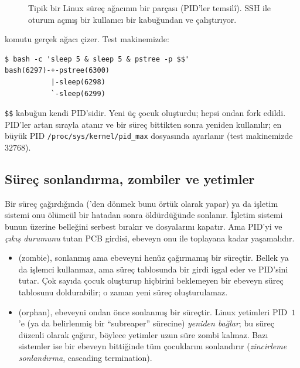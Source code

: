 \begin{figure}[H]
\centering
{}
\caption{Tipik bir Linux süreç ağacının bir parçası (PID'ler temsilî). SSH ile oturum açmış bir kullanıcı bir  kabuğundan  ve  çalıştırıyor.}
\end{figure}

 komutu gerçek ağacı çizer. Test makinemizde:
\begin{lstlisting}[style=term]
$ bash -c 'sleep 5 & sleep 5 & pstree -p $$'
bash(6297)-+-pstree(6300)
           |-sleep(6298)
           `-sleep(6299)
\end{lstlisting}
\verb|$$| kabuğun kendi PID'sidir. Yeni  üç çocuk oluşturdu; hepsi ondan fork edildi. PID'ler artan sırayla atanır ve bir süreç bittikten sonra yeniden kullanılır; en büyük PID \nolinkurl{/proc/sys/kernel/pid_max} dosyasında ayarlanır (test makinemizde $32768$).

\subsection{Süreç sonlandırma, zombiler ve yetimler}
\label{sec:zombie}

Bir süreç  çağırdığında ('den dönmek bunu örtük olarak yapar) ya da işletim sistemi onu ölümcül bir hatadan sonra öldürdüğünde sonlanır. İşletim sistemi bunun üzerine belleğini serbest bırakır ve dosyalarını kapatır. Ama PID'yi ve \emph{çıkış durumunu} tutan PCB girdisi, ebeveyn onu  ile toplayana kadar yaşamalıdır.

\begin{itemize}
  \item {} (zombie), sonlanmış ama ebeveyni henüz  çağırmamış bir süreçtir. Bellek ya da işlemci kullanmaz, ama süreç tablosunda bir girdi işgal eder ve PID'sini tutar. Çok sayıda çocuk oluşturup hiçbirini beklemeyen bir ebeveyn süreç tablosunu doldurabilir; o zaman yeni süreç oluşturulamaz.
  \item {} (orphan), ebeveyni ondan önce sonlanmış bir süreçtir. Linux yetimleri PID~$1$'e (ya da belirlenmiş bir ``subreaper'' sürecine) \emph{yeniden bağlar}; bu süreç düzenli olarak  çağırır, böylece yetimler uzun süre zombi kalmaz. Bazı sistemler ise bir ebeveyn bittiğinde tüm çocuklarını sonlandırır (\emph{zincirleme sonlandırma}, cascading termination).
\end{itemize}


